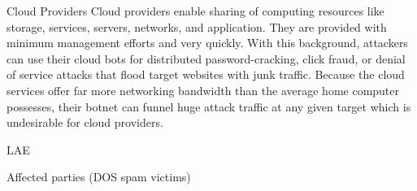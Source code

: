 \label{cap:sec4}


Cloud Providers 
Cloud  providers enable sharing of computing resources like storage, services, servers, networks, and application. They are provided with minimum management efforts and very quickly. With this background, attackers can use their cloud bots for distributed password-cracking, click fraud, or denial of service attacks that flood target websites with junk traffic. Because the cloud services offer far more networking bandwidth than the average home computer possesses, their botnet can funnel huge attack traffic at any given target which is undesirable for cloud providers.

LAE


Affected parties (DOS spam victims)
